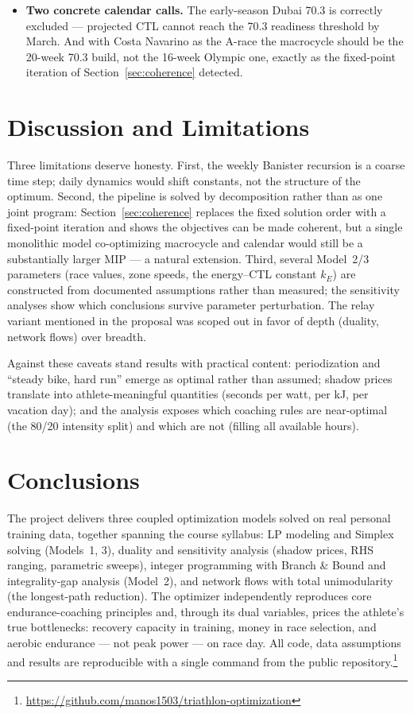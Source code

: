 \documentclass[11pt,a4paper]{article}
\begin{document}
\begin{itemize}
\item \textbf{Two concrete calendar calls.} The early-season Dubai 70.3 is
correctly excluded --- projected CTL cannot reach the 70.3 readiness threshold
by March. And with Costa Navarino as the A-race the macrocycle should be the
20-week 70.3 build, not the 16-week Olympic one, exactly as the fixed-point
iteration of Section~\ref{sec:coherence} detected.
\end{itemize}

\section{Discussion and Limitations}

Three limitations deserve honesty. First, the weekly Banister recursion is a
coarse time step; daily dynamics would shift constants, not the structure of the
optimum. Second, the pipeline is solved by
decomposition rather than as one joint program: Section~\ref{sec:coherence}
replaces the fixed solution order with a fixed-point iteration and shows the
objectives can be made coherent, but a single monolithic model co-optimizing
macrocycle and calendar would still be a substantially larger MIP --- a natural
extension. Third, several Model~2/3 parameters
(race values, zone speeds, the energy--CTL constant $k_E$) are constructed from
documented assumptions rather than measured; the sensitivity analyses show which
conclusions survive parameter perturbation. The relay variant mentioned in the
proposal was scoped out in favor of depth (duality, network flows) over breadth.

Against these caveats stand results with practical content: periodization and
``steady bike, hard run'' emerge as optimal rather than assumed; shadow prices
translate into athlete-meaningful quantities (seconds per watt, per kJ, per
vacation day); and the analysis exposes which coaching rules are near-optimal (the
80/20 intensity split) and which are not (filling all available hours).

\section{Conclusions}

The project delivers three coupled optimization models solved on real personal
training data, together spanning the course syllabus: LP modeling and Simplex
solving (Models~1, 3), duality and sensitivity analysis (shadow prices, RHS
ranging, parametric sweeps), integer programming with Branch \& Bound and
integrality-gap analysis (Model~2), and network flows with total unimodularity
(the longest-path reduction). The optimizer independently reproduces core
endurance-coaching principles and, through its dual variables, prices the
athlete's true bottlenecks: recovery capacity in training, money in race
selection, and aerobic endurance --- not peak power --- on race day. All code, data
assumptions and results are reproducible with a single command from the public
repository.\footnote{\url{https://github.com/manos1503/triathlon-optimization}}
\end{document}
